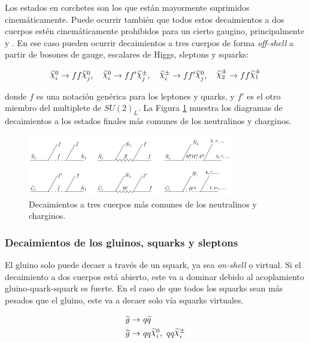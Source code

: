 Los estados en corchetes son los que están mayormente suprimidos cinemáticamente. Puede ocurrir también que todos estos decaimientos a dos cuerpos estén cinemáticamente prohibidos para un cierto gaugino, principalmente \chinoonepm y \ninotwo. En ese caso pueden ocurrir decaimientos a tres cuerpos de forma \textit{off-shell} a partir de bosones de gauge, escalares de Higgs, sleptons y squarks:

\begin{equation}
	\ggino^0_i \to ff\ggino^0_j,\quad \ggino^0_i \to ff'\ggino^\pm_j,\quad \ggino^\pm_i \to ff'\ggino^0_j,\quad \chinotwopm \to ff\chinoonepm
\end{equation}

\noindent
donde $f$ es una notación genérica para los leptones y quarks, y $f'$ es el otro miembro del multiplete de $SU(2)_L$. La Figura \ref{fig:susy_three_body_decays} muestra los diagramas de decaimientos a los estados finales más comunes de los neutralinos y charginos.



\begin{figure}[H]
  \centering
  \includegraphics[width=0.8\textwidth]{images/theory/nc_decays.png}
  \caption{Decaimientos a tres cuerpos más comunes de los neutralinos y charginos.}
  \label{fig:susy_three_body_decays}
\end{figure}

\subsubsection{Decaimientos de los gluinos, squarks y sleptons}

El gluino solo puede decaer a través de un squark, ya sea \textit{on-shell} o virtual. Si el decaimiento a
dos cuerpos está abierto, este va a dominar debido al acoplamiento gluino-quark-squark es fuerte.
En el caso de que todos los squarks sean más pesados que el gluino, este va a decaer solo vía
squarks virtuales.



\begin{equation}
	\begin{split}
		\gluino\to &\ q\squark \\
		\gluino\to &\ qq\ggino^0_i,\ qq\ggino^\pm_i \\
	\end{split}
	\label{eq:gluino_dec}
\end{equation}


